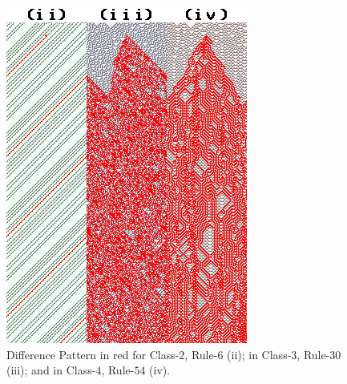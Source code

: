 \begin{figure}
    \centering
    \includegraphics[width=\linewidth]{Images/P4/4classesDiffPatt.png}
    \caption{Difference Pattern in red for Class-$2$, Rule-$6$ (ii); in Class-$3$, Rule-$30$ (iii); and in Class-$4$, Rule-$54$ (iv).}
    \label{fig:4classDiffPatt}
\end{figure}







\clearpage



